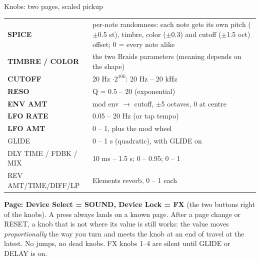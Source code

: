 \documentclass{article}
\newcommand{\FX}[1]{\textcolor{fxc}{#1}}
\begin{document}
\vspace{1.2mm}
\begin{minipage}[t]{70mm}\vspace{0pt}
\begin{card}{Knobs: two pages, scaled pickup}
\begin{tabularx}{\linewidth}{@{}l L@{}}
\textbf{SPICE} & per-note randomness: each note gets its own pitch (\(\pm\)0.5 st), timbre, color (\(\pm\)0.3) and cutoff (\(\pm\)1.5 oct) offset; 0 = every note alike \\
\textbf{TIMBRE / COLOR} & the two Braids parameters (meaning depends on the shape) \\
\textbf{\textcolor{fltc}{CUTOFF}} & 20 Hz \(\cdot 2^{10k}\): 20 Hz -- 20 kHz \\
\textbf{\textcolor{fltc}{RESO}} & Q = 0.5 -- 20 (exponential) \\
\textbf{\textcolor{modc}{ENV AMT}} & mod env \(\to\) cutoff, \(\pm\)5 octaves, 0 at centre \\
\textbf{\textcolor{lfoc}{LFO RATE}} & 0.05 -- 20 Hz (or tap tempo) \\
\textbf{\textcolor{lfoc}{LFO AMT}} & 0 -- 1, plus the mod wheel \\[0.6mm]
\FX{GLIDE} & 0 -- 1 s (quadratic), with GLIDE on \\
\FX{DLY TIME / FDBK / MIX} & 10 ms -- 1.5 s; 0 -- 0.95; 0 -- 1 \\
\FX{REV AMT/TIME/DIFF/LP} & Elements reverb, 0 -- 1 each \\
\end{tabularx}
\vspace{0.6mm}
\textbf{Page: Device Select = SOUND, Device Lock = FX} (the two buttons right of the knobs).
A press always lands on a known page.
After a page change or RESET, a knob that is not where its value is still works: the value moves
\emph{proportionally} the way you turn and meets the knob at an end of travel at the latest. No jumps, no dead knobs.
FX knobs 1--4 are silent until GLIDE or DELAY is on.
\end{card}
\end{minipage}\hfill
\end{document}
